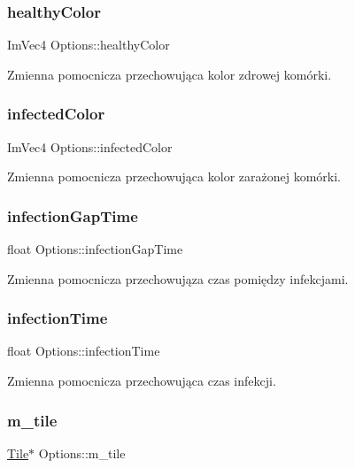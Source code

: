 \subsubsection{\texorpdfstring{healthy\+Color}{healthyColor}}
{\footnotesize\ttfamily Im\+Vec4 Options\+::healthy\+Color}

Zmienna pomocnicza przechowująca kolor zdrowej komórki. \mbox{\label{class_options_aa727b64a88f3b6dac54e70b675e303da}} 
\subsubsection{\texorpdfstring{infected\+Color}{infectedColor}}
{\footnotesize\ttfamily Im\+Vec4 Options\+::infected\+Color}

Zmienna pomocnicza przechowująca kolor zarażonej komórki. \mbox{\label{class_options_ad8957194973c1d0c3c861b187cde47b9}} 
\subsubsection{\texorpdfstring{infection\+Gap\+Time}{infectionGapTime}}
{\footnotesize\ttfamily float Options\+::infection\+Gap\+Time}

Zmienna pomocnicza przechowująza czas pomiędzy infekcjami. \mbox{\label{class_options_aef217faac2fc40d51e584cbc11c738d5}} 
\subsubsection{\texorpdfstring{infection\+Time}{infectionTime}}
{\footnotesize\ttfamily float Options\+::infection\+Time}

Zmienna pomocnicza przechowująca czas infekcji. \mbox{\label{class_options_a5bed080c76f38af4f624fc17a437427b}} 
\subsubsection{\texorpdfstring{m\+\_\+tile}{m\_tile}}
{\footnotesize\ttfamily \mbox{\hyperlink{class_tile}{Tile}}$\ast$ Options\+::m\+\_\+tile\hspace{0.3cm}{\ttfamily [private]}}

